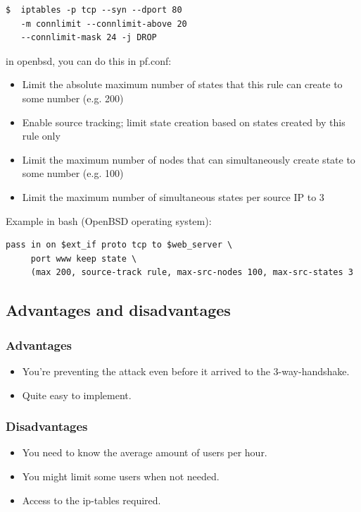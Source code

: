 \documentclass{report}
\begin{document}
\begin{lstlisting}[frame=single]
$  iptables -p tcp --syn --dport 80
   -m connlimit --connlimit-above 20
   --connlimit-mask 24 -j DROP
\end{lstlisting}

in openbsd, you can do this in pf.conf:

\begin{itemize}
\item Limit the absolute maximum number of states that this rule can create to some number (e.g. 200)
\item Enable source tracking; limit state creation based on states created by this rule only
\item Limit the maximum number of nodes that can simultaneously create state to some number (e.g. 100)
\item Limit the maximum number of simultaneous states per source IP to 3
\end{itemize}
\hfill \break
Example in bash (OpenBSD operating system):

\begin{lstlisting}[frame=single]
pass in on $ext_if proto tcp to $web_server \
     port www keep state \
     (max 200, source-track rule, max-src-nodes 100, max-src-states 3

\end{lstlisting}


\subsection {Advantages and disadvantages }
\subsubsection{Advantages} 
\begin{itemize}
\item You’re preventing the attack even before it arrived to the 3-way-handshake.
\item Quite easy to implement.
\end{itemize}
\subsubsection{Disadvantages}
\begin{itemize}
\item You need to know the average amount of users per hour.
\item You might limit some users when not needed.
\item Access to the ip-tables required.
\end{itemize}
\end{document}
